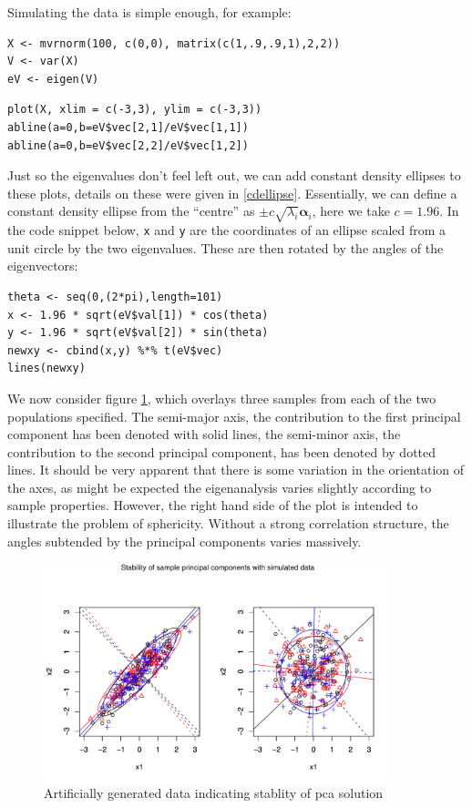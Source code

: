 Simulating the data is simple enough, for example:
\singlespacing
\begin{verbatim}
X <- mvrnorm(100, c(0,0), matrix(c(1,.9,.9,1),2,2))
V <- var(X)
eV <- eigen(V)
\end{verbatim}
\onehalfspacing

\singlespacing
\begin{verbatim}
plot(X, xlim = c(-3,3), ylim = c(-3,3))
abline(a=0,b=eV$vec[2,1]/eV$vec[1,1])
abline(a=0,b=eV$vec[2,2]/eV$vec[1,2])
\end{verbatim}
\onehalfspacing

Just so the eigenvalues don't feel left out, we can add constant density ellipses to these plots, details on these were given in \ref{cdellipse}.  Essentially, we can define a constant density ellipse from the ``centre'' as $\pm c \sqrt{\lambda_{i}} \boldsymbol{\alpha}_{i}$, here we take $c=1.96$.   In the code snippet below, \verb+x+ and \verb+y+ are the coordinates of an ellipse scaled from a unit circle by the two eigenvalues.   These are then rotated by the angles of the eigenvectors:

\singlespacing
\begin{verbatim}
theta <- seq(0,(2*pi),length=101)
x <- 1.96 * sqrt(eV$val[1]) * cos(theta)
y <- 1.96 * sqrt(eV$val[2]) * sin(theta)
newxy <- cbind(x,y) %*% t(eV$vec)
lines(newxy)
\end{verbatim}
\onehalfspacing

We now consider figure \ref{pcastabsynth}, which overlays three samples from each of the two populations specified.   The semi-major axis, the contribution to the first principal component has been denoted with solid lines, the semi-minor axis, the contribution to the second principal component, has been denoted by dotted lines.   It should be very apparent that there is some variation in the orientation of the axes, as might be expected the eigenanalysis varies slightly according to sample properties.   However, the right hand side of the plot is intended to illustrate the problem of sphericity.   Without a strong correlation structure, the angles subtended by the principal components varies massively.

\begin{figure}
\includegraphics[width = 0.9\textwidth]{images/pcastability}
\caption{Artificially generated data indicating stablity of pca solution}
\label{pcastabsynth}
\end{figure}

